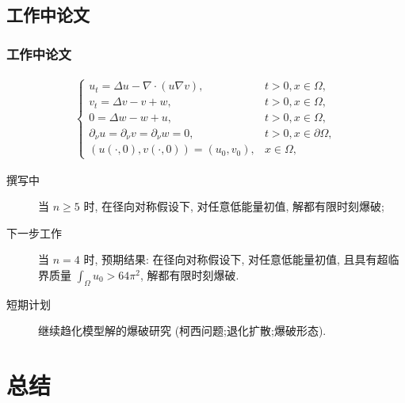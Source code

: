\subsection{工作中论文}

\begin{frame}
  \frametitle{工作中论文}
  \begin{align}
    \begin{cases}
      \label{sys: ks isp pp/ep/e}
        u_t = \Delta u - \nabla \cdot(u\nabla v),&  t>0, x\in\Omega,\\
        v_t =  \Delta v - v + w,&  t>0, x\in\Omega,	\\
        0  = \Delta w - w + u, &  t > 0, x\in\Omega, \\
        \partial_\nu u = \partial_\nu v = \partial_\nu w = 0 , & t >0, x\in\partial\Omega,\\
        (u(\cdot, 0), v(\cdot, 0)) = (u_0, v_0), & x\in\Omega,
    \end{cases}
  \end{align}
  \begin{description}
    \item [撰写中] 当 $n \geq 5$ 时, 在径向对称假设下, 对任意低能量初值, 解都\alert{有限时刻}爆破;
    \item [下一步工作] 当 $n = 4$ 时, 预期结果: 在径向对称假设下, 对任意低能量初值, 
    且具有超临界质量 $\int_\Omega u_0 > 64\pi^2$, 解都有限时刻爆破.
    \item [短期计划] 继续趋化模型解的爆破研究 (柯西问题;退化扩散;爆破形态).
  \end{description}
\end{frame}

\section{总结}

